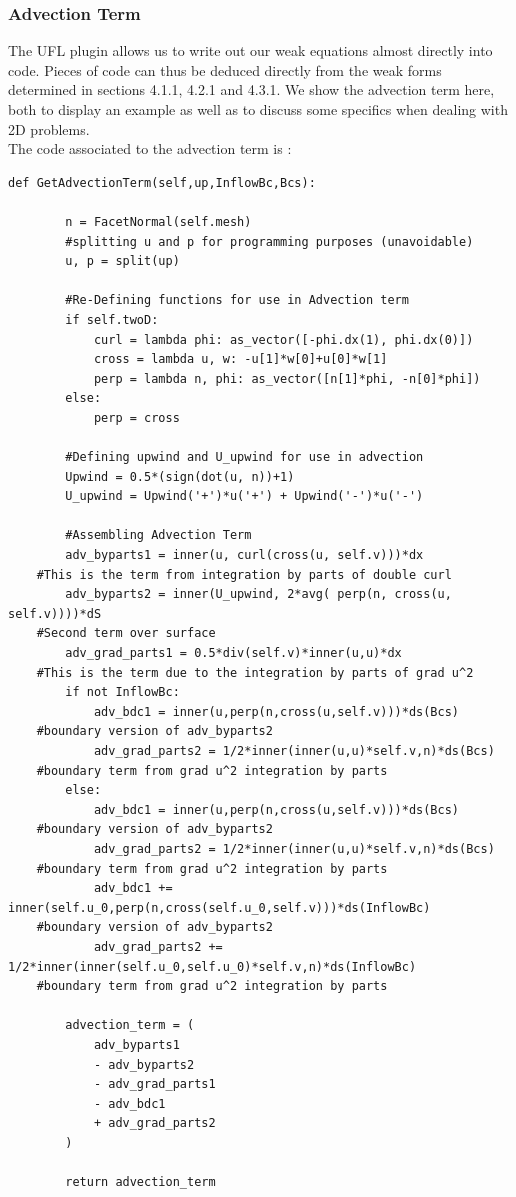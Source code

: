 \documentclass[11pt,twoside,a4paper]{article}
\begin{document}
\subsubsection{Advection Term}
The UFL plugin allows us to write out our weak equations almost directly into code. Pieces of code can thus be deduced directly from the weak forms determined in sections 4.1.1, 4.2.1 and 4.3.1. We show the advection term here, both to display an example as well as to discuss some specifics when dealing with 2D problems.\\
The code associated to the advection term is :
\begin{lstlisting}
def GetAdvectionTerm(self,up,InflowBc,Bcs):

        n = FacetNormal(self.mesh)
        #splitting u and p for programming purposes (unavoidable)
        u, p = split(up)

        #Re-Defining functions for use in Advection term
        if self.twoD:
            curl = lambda phi: as_vector([-phi.dx(1), phi.dx(0)])
            cross = lambda u, w: -u[1]*w[0]+u[0]*w[1]
            perp = lambda n, phi: as_vector([n[1]*phi, -n[0]*phi])
        else:
            perp = cross

        #Defining upwind and U_upwind for use in advection
        Upwind = 0.5*(sign(dot(u, n))+1)
        U_upwind = Upwind('+')*u('+') + Upwind('-')*u('-')

        #Assembling Advection Term
        adv_byparts1 = inner(u, curl(cross(u, self.v)))*dx
	#This is the term from integration by parts of double curl
        adv_byparts2 = inner(U_upwind, 2*avg( perp(n, cross(u, self.v))))*dS
	#Second term over surface
        adv_grad_parts1 = 0.5*div(self.v)*inner(u,u)*dx
	#This is the term due to the integration by parts of grad u^2
        if not InflowBc:
            adv_bdc1 = inner(u,perp(n,cross(u,self.v)))*ds(Bcs)
	#boundary version of adv_byparts2
            adv_grad_parts2 = 1/2*inner(inner(u,u)*self.v,n)*ds(Bcs)
	#boundary term from grad u^2 integration by parts
        else:
            adv_bdc1 = inner(u,perp(n,cross(u,self.v)))*ds(Bcs)
	#boundary version of adv_byparts2
            adv_grad_parts2 = 1/2*inner(inner(u,u)*self.v,n)*ds(Bcs)
	#boundary term from grad u^2 integration by parts
            adv_bdc1 +=  inner(self.u_0,perp(n,cross(self.u_0,self.v)))*ds(InflowBc)
	#boundary version of adv_byparts2
            adv_grad_parts2 += 1/2*inner(inner(self.u_0,self.u_0)*self.v,n)*ds(InflowBc)
	#boundary term from grad u^2 integration by parts

        advection_term = (
            adv_byparts1
            - adv_byparts2
            - adv_grad_parts1
            - adv_bdc1
            + adv_grad_parts2
        )

        return advection_term
\end{lstlisting}
\end{document}
